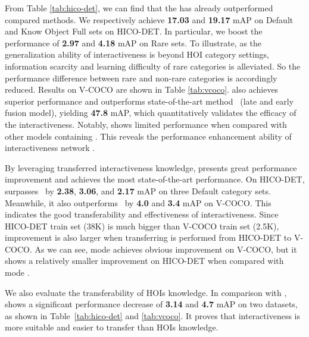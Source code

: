 \documentclass[10pt,twocolumn,letterpaper]{article}
\begin{document}
 From Table \ref{tab:hico-det}, we can find that the  has already outperformed compared methods. We respectively achieve
\textbf{17.03} and \textbf{19.17} mAP 
on Default and Know Object Full sets on HICO-DET. In particular, we boost the performance of
\textbf{2.97} and \textbf{4.18} mAP 
on Rare sets. 
To illustrate, as the generalization ability of interactiveness is beyond HOI category settings, information scarcity and learning difficulty of rare categories is alleviated. So the performance difference between rare and non-rare categories is accordingly reduced.
Results on V-COCO are shown in Table \ref{tab:vcoco}.  also achieves superior performance and outperforms state-of-the-art method~\cite{gao2018ican} (late and early fusion model), yielding 
\textbf{47.8} mAP, 
which quantitatively validates the efficacy of the interactiveness.
Notably,  shows limited performance when compared with other models containing . This reveals the performance enhancement ability of interactiveness network .

 By leveraging transferred interactiveness knowledge,  presents great performance improvement and achieves the most state-of-the-art performance. On HICO-DET,  surpasses~\cite{gao2018ican} by 
\textbf{2.38}, \textbf{3.06}, and \textbf{2.17} mAP 
on three Default category sets. Meanwhile, it also outperforms~\cite{gao2018ican} by 
\textbf{4.0} and \textbf{3.4} mAP on V-COCO. 
This indicates the good transferability and effectiveness of interactiveness.
Since HICO-DET train set (38K) is much bigger than V-COCO train set (2.5K), improvement is also larger when transferring is performed from HICO-DET to V-COCO. 
As we can see, mode  achieves obvious improvement on V-COCO, but it shows a relatively smaller improvement on HICO-DET when compared with mode .

We also evaluate the transferability of HOIs knowledge. In comparison with ,  shows a significant performance decrease of 
\textbf{3.14} and \textbf{4.7} mAP 
on two datasets, as shown in Table~\ref{tab:hico-det} and \ref{tab:vcoco}. It proves that interactiveness is more suitable and easier to transfer than HOIs knowledge.
\end{document}
